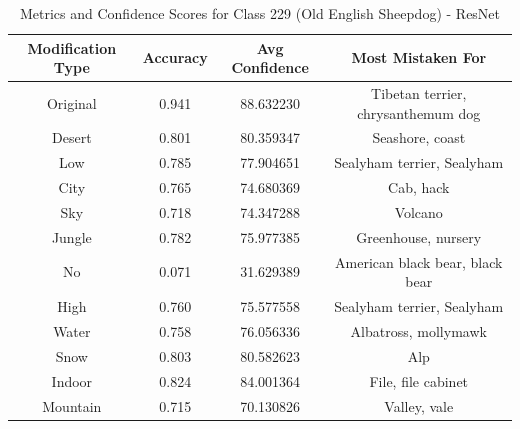 \begin{table}
	\centering
	\begin{tabular}{|c|c|c|c|}
		\hline
		\textbf{Modification Type} & \textbf{Accuracy} & \textbf{Avg Confidence} & \textbf{Most Mistaken For} \\
		\hline
		Original & 0.941 & 88.632230 & Tibetan terrier, chrysanthemum dog \\
		\hline
		Desert & 0.801 & 80.359347 & Seashore, coast \\
		\hline
		Low & 0.785 & 77.904651 & Sealyham terrier, Sealyham \\
		\hline
		City & 0.765 & 74.680369 & Cab, hack \\
		\hline
		Sky & 0.718 & 74.347288 & Volcano \\
		\hline
		Jungle & 0.782 & 75.977385 & Greenhouse, nursery \\
		\hline
		No & 0.071 & 31.629389 & American black bear, black bear \\
		\hline
		High & 0.760 & 75.577558 & Sealyham terrier, Sealyham \\
		\hline
		Water & 0.758 & 76.056336 & Albatross, mollymawk \\
		\hline
		Snow & 0.803 & 80.582623 & Alp \\
		\hline
		Indoor & 0.824 & 84.001364 & File, file cabinet \\
		\hline
		Mountain & 0.715 & 70.130826 & Valley, vale \\
		\hline
	\end{tabular}
	\caption{Metrics and Confidence Scores for Class 229 (Old English Sheepdog) - ResNet}
	\label{tab:metrics_confidence_class_229_resnet}
\end{table}

